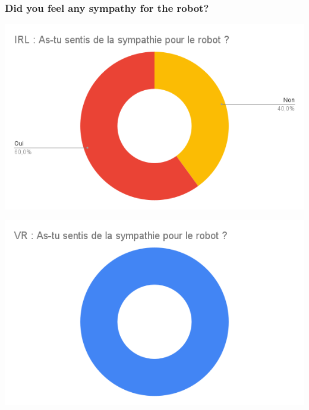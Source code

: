     \subsubsection{Did you feel any sympathy for the robot?}
    \begin{minipage}{.5\textwidth}%
    \includegraphics[width=\textwidth]{Datas_childs/IRL _ As-tu sentis de la sympathie pour le robot _.png}
    \end{minipage}%
    \begin{minipage}{.5\textwidth}%
    \includegraphics[width=\textwidth]{Datas_childs/VR _ As-tu sentis de la sympathie pour le robot _.png}
    \end{minipage}%
    \vspace*{0.5cm}

